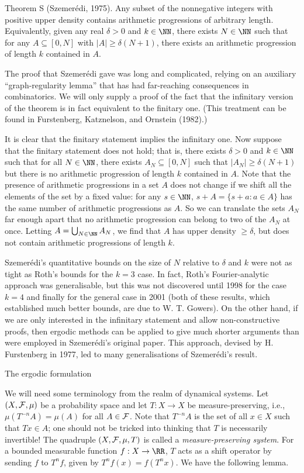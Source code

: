 \parenproclaim Theorem S (Szemer\'edi, {\rm 1975}). Any subset of the nonnegative integers with positive upper
density contains arithmetic progressions of arbitrary length. Equivalently, given any real $\delta > 0$ and
$k\in \NN$, there exists $N\in \NN$ such that for any $A\subseteq [0,N]$ with $|A|\geq \delta(N+1)$, there exists
an arithmetic progression of length $k$ contained in $A$.

\noindent
The proof that Szemer\'edi gave was long and complicated, relying on an auxiliary ``graph-regularity lemma''
that has had far-reaching consequences in combinatorics. We will only supply a proof of the fact
that the infinitary version of the theorem is in fact equivalent to the finitary one. (This treatment
can be found in Furstenberg, Katznelson, and Ornstein (1982).)

\proof It is clear that the finitary statement implies the infinitary one. Now suppose that the finitary
statement does not hold; that is, there exists $\delta>0$ and $k\in \NN$ such that for all $N\in \NN$,
there exists $A_N\subseteq [0,N]$ such that $|A_N|\geq \delta(N+1)$ but there is no arithmetic progression
of length $k$ contained in $A$. Note that the presence of arithmetic progressions in a set $A$ does not
change if we shift all the elements of the set by a fixed value: for any $s\in \NN$,
$s+A = \{s + a : a\in A\}$ has the
same number of arithmetic progressions as $A$. So we can translate the sets $A_N$ far enough apart that no
arithmetic progression can belong to two of the $A_N$ at once. Letting $A = \bigcup_{N\in \NN} A_N$,
we find that $A$ has upper density $\geq \delta$, but does not contain arithmetic progressions of length $k$.\slug

Szemer\'edi's quantitative bounds on the size of $N$ relative to $\delta$ and $k$ were not as tight
as Roth's bounds for the $k=3$ case. In fact, Roth's Fourier-analytic approach was generalisable,
but this was not discovered until 1998 for the case
$k=4$ and finally for the general case in 2001 (both of these results, which established much better bounds,
are due to W. T. Gowers). On the other
hand, if we are only interested in the infinitary statement and allow non-constructive proofs, then ergodic
methods can be applied to give much shorter arguments than were employed in Szemer\'edi's original paper.
This approach, devised by H. Furstenberg in 1977, led to many generalisations of Szemer\'edi's result.

\advsect The ergodic formulation

We will need some terminology from the realm of dynamical systems.
Let $(X,{\cal F},\mu)$ be a probability space and let $T:X\to X$ be measure-preserving, i.e.,
$\mu(T^{-n} A) = \mu(A)$ for all $A\in {\cal F}$. Note that $T^{-n}A$ is the set of all $x\in X$ such that $Tx\in A$;
one should not be tricked into thinking that $T$ is necessarily invertible!
The quadruple $(X,{\cal F},\mu,T)$ is called a {\it measure-preserving
system}. For a bounded measurable function $f:X\to\RR$, $T$ acts as a shift operator by sending $f$ to $T^n f$,
given by $T^nf(x) = f(T^nx)$. We have the following lemma.

